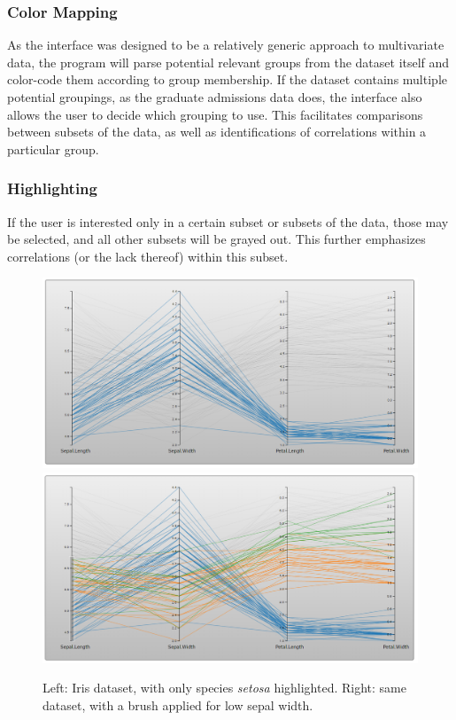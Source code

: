 \documentclass[]{article}
\begin{document}
		\subsubsection{Color Mapping}
			As the interface was designed to be a relatively generic approach to multivariate data, the program will parse potential relevant groups from the dataset itself and color-code them according to group membership. If the dataset contains multiple potential groupings, as the graduate admissions data does, the interface also allows the user to decide which grouping to use. This facilitates comparisons between subsets of the data, as well as identifications of correlations within a particular group.
		\subsubsection{Highlighting}
			If the user is interested only in a certain subset or subsets of the data, those may be selected, and all other subsets will be grayed out. This further emphasizes correlations (or the lack thereof) within this subset.
		\begin{figure}[h]
			\includegraphics[width=\linewidth/2]{highlight.png}
			\includegraphics[width=\linewidth/2]{brush.png}
			\caption{Left: Iris dataset, with only species \textit{setosa} highlighted. Right: same dataset, with a brush applied for low sepal width.}
			\label{fig:Brush/Highlight}
		\end{figure}
\end{document}
